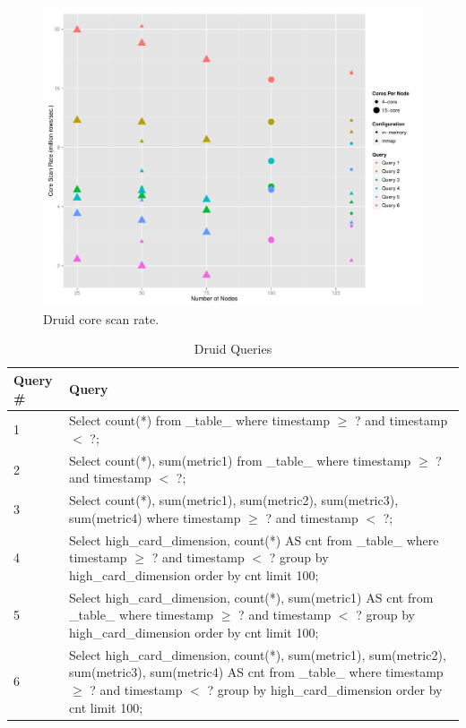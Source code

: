 \documentclass{vldb}
\begin{document}
\begin{figure}
\centering
\includegraphics[width = 6in]{core_scan_rate}
\caption{Druid core scan rate.}
\label{fig:core_scan_rate}
\end{figure}

\begin{table}
  \centering
  \caption{Druid Queries}
  \label{tab:sql_queries}
    \begin{tabular}{| l | l |}
    \hline
    Query \# & Query \\ \hline
    1 & Select count(*) from \_table\_ where timestamp $\geq$ ? and timestamp $<$ ?; \\ \hline
    2 & Select count(*), sum(metric1) from \_table\_ where timestamp $\geq$ ? and timestamp $<$ ?; \\ \hline
    3 & Select count(*), sum(metric1), sum(metric2), sum(metric3), sum(metric4) where timestamp $\geq$ ? and timestamp $<$ ?; \\ \hline
    4 & Select high\_card\_dimension, count(*) AS cnt from \_table\_ where timestamp $\geq$ ? and timestamp $<$ ? group by high\_card\_dimension order by cnt limit 100; \\ \hline
    5 & Select high\_card\_dimension, count(*), sum(metric1) AS cnt from \_table\_ where timestamp $\geq$ ? and timestamp $<$ ? group by high\_card\_dimension order by cnt limit 100; \\ \hline
    6 & Select high\_card\_dimension, count(*), sum(metric1), sum(metric2), sum(metric3), sum(metric4) AS cnt from \_table\_ where timestamp $\geq$ ? and timestamp $<$ ? group by high\_card\_dimension order by cnt limit 100; \\
    \hline
    \end{tabular}
\end{table}
\end{document}
